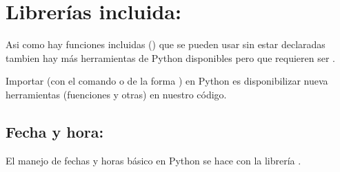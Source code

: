 \documentclass[a5paper,9pt,spanish]{sphinxmanual}
\begin{document}
\begin{sphinxVerbatim}[commandchars=\\\{\}]
  
   \PYG{p}{[}
    \PYG{p}{[}  \PYG{p}{]}
    \PYG{p}{[}   \PYG{p}{]}
    \PYG{p}{[}    \PYG{p}{]}
    \PYG{p}{[}  \PYG{p}{]}
\PYG{p}{]}

  \PYG{p}{[}  \PYG{p}{]}
  
   \PYG{p}{[}\PYG{p}{[}  \PYG{p}{]}\PYG{p}{]}

\end{sphinxVerbatim}

\sphinxstepscope


\chapter{Librerías incluida: }
\label{\detokenize{datetime:librerias-incluida-datetime}}\label{\detokenize{datetime::doc}}
\sphinxAtStartPar
Asi como hay funciones incluidas () que se pueden usar sin
estar declaradas tambien hay más herramientas de Python disponibles pero
que requieren ser .

\sphinxAtStartPar
Importar (con el comando  o de la forma )
en Python es disponibilizar nueva herramientas (fuenciones y otras) en
nuestro código.


\section{Fecha y hora: }
\label{\detokenize{datetime:fecha-y-hora-datetime}}
\sphinxAtStartPar
El manejo de fechas y horas básico en Python se hace con la librería .
\end{document}
